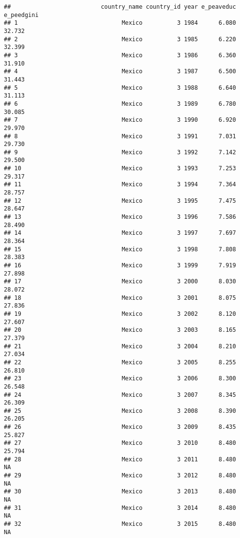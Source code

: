\documentclass[
]{article}
\begin{document}
\begin{verbatim}
##                          country_name country_id year e_peaveduc e_peedgini
## 1                              Mexico          3 1984      6.080     32.732
## 2                              Mexico          3 1985      6.220     32.399
## 3                              Mexico          3 1986      6.360     31.910
## 4                              Mexico          3 1987      6.500     31.443
## 5                              Mexico          3 1988      6.640     31.113
## 6                              Mexico          3 1989      6.780     30.085
## 7                              Mexico          3 1990      6.920     29.970
## 8                              Mexico          3 1991      7.031     29.730
## 9                              Mexico          3 1992      7.142     29.500
## 10                             Mexico          3 1993      7.253     29.317
## 11                             Mexico          3 1994      7.364     28.757
## 12                             Mexico          3 1995      7.475     28.647
## 13                             Mexico          3 1996      7.586     28.490
## 14                             Mexico          3 1997      7.697     28.364
## 15                             Mexico          3 1998      7.808     28.383
## 16                             Mexico          3 1999      7.919     27.898
## 17                             Mexico          3 2000      8.030     28.072
## 18                             Mexico          3 2001      8.075     27.836
## 19                             Mexico          3 2002      8.120     27.607
## 20                             Mexico          3 2003      8.165     27.379
## 21                             Mexico          3 2004      8.210     27.034
## 22                             Mexico          3 2005      8.255     26.810
## 23                             Mexico          3 2006      8.300     26.548
## 24                             Mexico          3 2007      8.345     26.309
## 25                             Mexico          3 2008      8.390     26.205
## 26                             Mexico          3 2009      8.435     25.827
## 27                             Mexico          3 2010      8.480     25.794
## 28                             Mexico          3 2011      8.480         NA
## 29                             Mexico          3 2012      8.480         NA
## 30                             Mexico          3 2013      8.480         NA
## 31                             Mexico          3 2014      8.480         NA
## 32                             Mexico          3 2015      8.480         NA

\end{verbatim}
\end{document}
